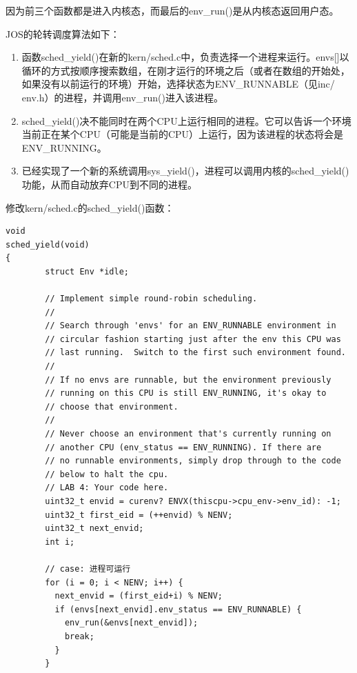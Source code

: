 \begin{ExerciseList}
因为前三个函数都是进入内核态，而最后的env\_run()是从内核态返回用户态。


JOS的轮转调度算法如下：

\begin{enumerate}
\item 函数sched\_yield()在新的kern/sched.c中，负责选择一个进程来运行。envs[]以循环的方式按顺序搜索数组，在刚才运行的环境之后（或者在数组的开始处，如果没有以前运行的环境）开始，选择状态为ENV\_RUNNABLE（见inc/ env.h）的进程，并调用env\_run()进入该进程。
\item sched\_yield()决不能同时在两个CPU上运行相同的进程。它可以告诉一个环境当前正在某个CPU（可能是当前的CPU）上运行，因为该进程的状态将会是ENV\_RUNNING。
\item 已经实现了一个新的系统调用sys\_yield()，进程可以调用内核的sched\_yield()功能，从而自动放弃CPU到不同的进程。
\end{enumerate}

修改kern/sched.c的sched\_yield()函数：

\begin{verbatim}
void
sched_yield(void)
{
        struct Env *idle;

        // Implement simple round-robin scheduling.
        //
        // Search through 'envs' for an ENV_RUNNABLE environment in
        // circular fashion starting just after the env this CPU was
        // last running.  Switch to the first such environment found.
        //
        // If no envs are runnable, but the environment previously
        // running on this CPU is still ENV_RUNNING, it's okay to
        // choose that environment.
        //
        // Never choose an environment that's currently running on
        // another CPU (env_status == ENV_RUNNING). If there are
        // no runnable environments, simply drop through to the code
        // below to halt the cpu.
        // LAB 4: Your code here.
        uint32_t envid = curenv? ENVX(thiscpu->cpu_env->env_id): -1;
        uint32_t first_eid = (++envid) % NENV;
        uint32_t next_envid;
        int i;

        // case: 进程可运行
        for (i = 0; i < NENV; i++) {
          next_envid = (first_eid+i) % NENV;
          if (envs[next_envid].env_status == ENV_RUNNABLE) {
            env_run(&envs[next_envid]);
            break;
          }
        }


\end{verbatim}
\end{ExerciseList}

